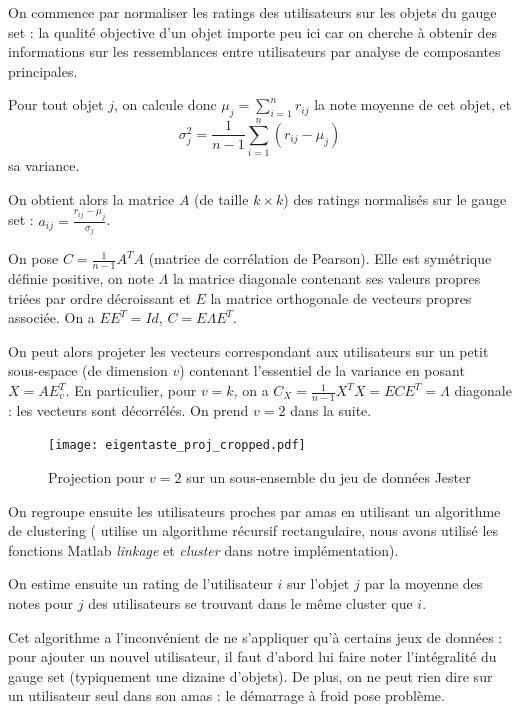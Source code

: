 \documentclass[11pt, openany, a4paper]{article}
\begin{document}
		On commence par normaliser les ratings des utilisateurs sur les objets du gauge set : la qualité objective d'un objet importe peu ici car on cherche à obtenir des informations sur les ressemblances entre utilisateurs par analyse de composantes principales.
		
		Pour tout objet $j$, on calcule donc $\mu_j=\sum_{i=1}^n r_{ij}$ la note moyenne de cet objet, et $$\sigma_j^2 = \frac{1}{n-1} \sum_{i=1}^{n} (r_{ij} - \mu_j)$$ sa variance.
		
		On obtient alors la matrice $A$ (de taille $k\times k$) des ratings normalisés sur le gauge set : $a_{ij} = \frac{r_{ij}-\mu_j}{\sigma_j}$.
		
		On pose $C=\frac{1}{n-1} A^T A$ (matrice de corrélation de Pearson). Elle est symétrique définie positive, on note $\Lambda$ la matrice diagonale contenant ses valeurs propres triées par ordre décroissant et $E$ la matrice orthogonale de vecteurs propres associée. On a $EE^T = Id$, $C = E\Lambda E^T$.
		
		On peut alors projeter les vecteurs correspondant aux utilisateurs sur un petit sous-espace (de dimension $v$) contenant l'essentiel de la variance en posant $X=AE^T_v$. 
		En particulier, pour $v=k$, on a $C_X = \frac{1}{n-1} X^T X = ECE^T = \Lambda$ diagonale : les vecteurs sont décorrélés.
		On prend $v=2$ dans la suite.
		
			\begin{figure}[ht!]
				\centering
				\texttt{[image: eigentaste\_proj\_cropped.pdf]}
				\caption{Projection pour $v=2$ sur un sous-ensemble du jeu de données Jester}
			\end{figure}
			
		On regroupe ensuite les utilisateurs proches par amas en utilisant un algorithme de clustering (\cite{Goldberg2001} utilise un algorithme récursif rectangulaire, nous avons utilisé les fonctions Matlab \emph{linkage} et \emph{cluster} dans notre implémentation).
		
		On estime ensuite un rating de l'utilisateur $i$ sur l'objet $j$ par la moyenne des notes pour $j$ des utilisateurs se trouvant dans le même cluster que $i$.
		
		\medskip
						
		Cet algorithme a l'inconvénient de ne s'appliquer qu'à certains jeux de données : pour ajouter un nouvel utilisateur, il faut d'abord lui faire noter l'intégralité du gauge set (typiquement une dizaine d'objets). De plus, on ne peut rien dire sur un utilisateur seul dans son amas : le démarrage à froid pose problème.
		
\end{document}
